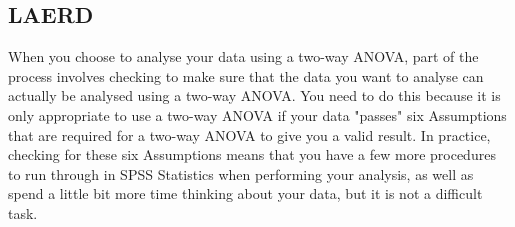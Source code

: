 \documentclass[]{article}
\begin{document}
\subsection{LAERD}



When you choose to analyse your data using a two-way ANOVA, part of the process involves checking to make sure that the data you want to analyse can actually be analysed using a two-way ANOVA. You need to do this because it is only appropriate to use a two-way ANOVA if your data "passes" six Assumptions that are required for a two-way ANOVA to give you a valid result. In practice, checking for these six Assumptions means that you have a few more procedures to run through in SPSS Statistics when performing your analysis, as well as spend a little bit more time thinking about your data, but it is not a difficult task.
\end{document}
